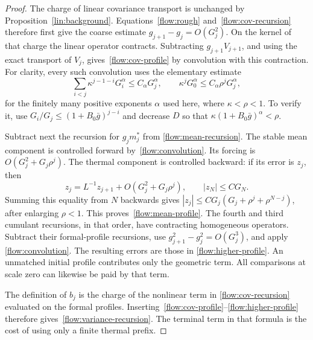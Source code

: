 \begin{proof}
The charge of linear covariance transport is unchanged by
Proposition~\ref{lin:background}.  Equations~\eqref{flow:rough}
and~\eqref{flow:cov-recursion} therefore first give the coarse estimate
$g_{j+1}-g_j=O(G_j^2)$.  On the kernel of that charge the linear operator
contracts.  Subtracting $g_{j+1}V_{j+1}$, and using the exact transport of
$V_j$, gives~\eqref{flow:cov-profile} by convolution with this contraction.
For clarity, every such convolution uses the elementary estimate
\begin{equation}\label{flow:convolution}
 \sum_{i<j}\kappa^{j-1-i}G_i^\alpha
 \le C_\alpha G_j^\alpha,\qquad
 \kappa^jG_0^\alpha\le C_\alpha\rho^jG_j^\alpha,
\end{equation}
for the finitely many positive exponents $\alpha$ used here, where
$\kappa<\rho<1$.  To verify it, use
$G_i/G_j\le(1+B_0\bar g)^{j-i}$ and decrease $D$ so that
$\kappa(1+B_0\bar g)^\alpha<\rho$.

Subtract next the recursion for $g_jm_j^*$ from
\eqref{flow:mean-recursion}.  The stable mean component is controlled
forward by~\eqref{flow:convolution}.  Its forcing is
$O(G_j^2+G_j\rho^j)$.  The thermal component is controlled backward:
if its error is $z_j$, then
\[
 z_j=L^{-1}z_{j+1}+O(G_j^2+G_j\rho^j),\qquad |z_N|\le CG_N.
\]
Summing this equality from $N$ backwards gives
$|z_j|\le CG_j(G_j+\rho^j+\rho^{N-j})$, after enlarging $\rho<1$.
This proves~\eqref{flow:mean-profile}.  The fourth and third cumulant
recursions, in that order, have contracting homogeneous operators.
Subtract their formal-profile recursions, use
$g_{j+1}^2-g_j^2=O(G_j^3)$, and apply
\eqref{flow:convolution}.  The resulting errors are those in
\eqref{flow:higher-profile}.  An unmatched initial profile contributes
only the geometric term.  All comparisons at scale zero can likewise
be paid by that term.

The definition of $b_j$ is the charge of the nonlinear term in
\eqref{flow:cov-recursion} evaluated on the formal profiles.
Inserting~\eqref{flow:cov-profile}--\eqref{flow:higher-profile}
therefore gives~\eqref{flow:variance-recursion}.  The terminal term in
that formula is the cost of using only a finite thermal prefix.


\end{proof}
